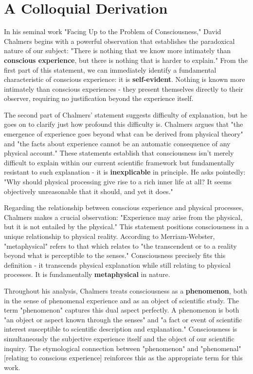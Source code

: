 \documentclass[runningheads]{llncs}
\begin{document}
\section{A Colloquial Derivation}

In his seminal work "Facing Up to the Problem of Consciousness," David Chalmers begins with a powerful observation that establishes the paradoxical nature of our subject: "There is nothing that we know more intimately than \textbf{conscious experience}, but there is nothing that is harder to explain." From the first part of this statement, we can immediately identify a fundamental characteristic of conscious experience: it is \textbf{self-evident}. Nothing is known more intimately than conscious experiences - they present themselves directly to their observer, requiring no justification beyond the experience itself.

The second part of Chalmers' statement suggests difficulty of explanation, but he goes on to clarify just how profound this difficulty is. Chalmers argues that "the emergence of experience goes beyond what can be derived from physical theory" and "the facts about experience cannot be an automatic consequence of any physical account." These statements establish that consciousness isn't merely difficult to explain within our current scientific framework but fundamentally resistant to such explanation - it is \textbf{inexplicable} in principle. He asks pointedly: "Why should physical processing give rise to a rich inner life at all? It seems objectively unreasonable that it should, and yet it does."

Regarding the relationship between conscious experience and physical processes, Chalmers makes a crucial observation: "Experience may arise from the physical, but it is not entailed by the physical." This statement positions consciousness in a unique relationship to physical reality. According to Merriam-Webster, "metaphysical" refers to that which relates to "the transcendent or to a reality beyond what is perceptible to the senses." Consciousness precisely fits this definition - it transcends physical explanation while still relating to physical processes. It is fundamentally \textbf{metaphysical} in nature.

Throughout his analysis, Chalmers treats consciousness as a \textbf{phenomenon}, both in the sense of phenomenal experience and as an object of scientific study. The term "phenomenon" captures this dual aspect perfectly. A phenomenon is both "an object or aspect known through the senses" and "a fact or event of scientific interest susceptible to scientific description and explanation." Consciousness is simultaneously the subjective experience itself and the object of our scientific inquiry. The etymological connection between "phenomenon" and "phenomenal" [relating to conscious experience] reinforces this as the appropriate term for this work.
\end{document}
